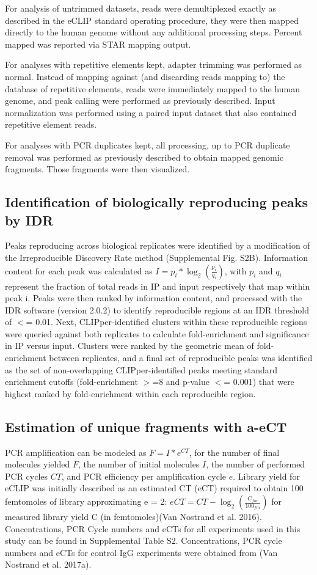 For analysis of untrimmed datasets, reads were demultiplexed exactly as described in the eCLIP standard operating procedure, they were then mapped directly to the human genome without any additional processing steps. Percent mapped was reported via STAR mapping output.

For analyses with repetitive elements kept, adapter trimming was performed as normal. Instead of mapping against (and discarding reads mapping to) the database of repetitive elements, reads were immediately mapped to the human genome, and peak calling were performed as previously described. Input normalization was performed using a paired input dataset that also contained repetitive element reads.

For analyses with PCR duplicates kept, all processing, up to PCR duplicate removal was performed as previously described to obtain mapped genomic fragments.  Those fragments were then visualized.

\subsection{Identification of biologically reproducing peaks by IDR}
Peaks reproducing across biological replicates were identified by a modification of the Irreproducible Discovery Rate method \cite{Li2011a} (Supplemental Fig. S2B). Information content for each peak was calculated as $I=p_i*\log_2(\frac{p_i}{q_i})$, with $p_i$ and $q_i$ represent the fraction of total reads in IP and input respectively that map within peak i. Peaks were then ranked by information content, and processed with the IDR software (version 2.0.2) to identify reproducible regions at an IDR threshold of $<$= 0.01. Next, CLIPper-identified clusters within these reproducible regions were queried against both replicates to calculate fold-enrichment and significance in IP versus input. Clusters were ranked by the geometric mean of fold-enrichment between replicates, and a final set of reproducible peaks was identified as the set of non-overlapping CLIPper-identified peaks meeting standard enrichment cutoffs (fold-enrichment $>$=8 and p-value $<$= 0.001) that were highest ranked by fold-enrichment within each reproducible region.

\subsection{Estimation of unique fragments with a-eCT}
PCR amplification can be modeled as $F=I*e^{CT}$, for the number of final molecules yielded $F$, the number of initial molecules $I$, the number of performed PCR cycles $CT$, and PCR efficiency per amplification cycle $e$. Library yield for eCLIP was initially described as an estimated CT (eCT) required to obtain 100 femtomoles of library approximating e = 2:
$eCT=CT-\log_2(\frac{C_{fm}}{100_{fm}})$ for measured library yield C (in femtomoles)(Van Nostrand et al. 2016). Concentrations, PCR Cycle numbers and eCTs for all experiments used in this study can be found in Supplemental Table S2.  Concentrations, PCR cycle numbers and eCTs for control IgG experiments were obtained from (Van Nostrand et al. 2017a).


